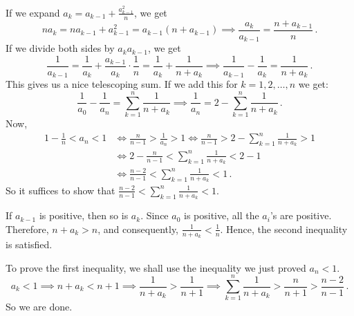 \documentclass[11pt]{scrartcl}
\begin{document}
\begin{soln}
If we expand \(a_{k}=a_{k-1}+\frac{a_{k-1}^{2}}{n}\), we get
\[
n a_{k}= na_{k-1}+a_{k-1}^2 =a_{k-1}\left(n+a_{k-1}\right) \implies  \frac{a_{k}}{a_{k-1}}=\frac{n+a_{k-1}}{n} \, .
\]
If we divide both sides by \(a_{k} a_{k-1}\), we get
\[
\frac{1}{a_{k-1}}=\frac{1}{a_{k}}+\frac{a_{k-1}}{a_{k}} \cdot \frac{1}{n} = \frac{1}{a_{k}} + \frac{1}{n+a_{k}}
\implies \frac{1}{a_{k-1}}-\frac{1}{a_{k}}=\frac{1}{n+a_{k}} \, .
\]
This gives us a nice telescoping sum. If we add this for \(k=1,2, \ldots, n\) we get:
\[
\frac{1}{a_{0}}-\frac{1}{a_{n}}=\sum_{k=1}^{n} \frac{1}{n+a_{k}} \implies \frac{1}{a_{n}}=2-\sum_{k=1}^{n} \frac{1}{n+a_{k}} \, .
\]
Now,
\begin{equation*}
\begin{split}
1- \frac{1}{n} < a_n < 1 &\iff \frac{n}{n-1} > \frac{1}{a_n} > 1 \iff \frac{n}{n-1} > 2-\sum_{k=1}^{n} \frac{1}{n+a_{k}} > 1 \\
&\iff 2-\frac{n}{n-1} <\sum_{k=1}^{n} \frac{1}{n+a_{k}} <2- 1 \\
&\iff \frac{n-2}{n-1}<\sum_{k=1}^{n} \frac{1}{n+a_{k}}<1 \, .
\end{split}
\end{equation*}
So it suffices to show that \(\frac{n-2}{n-1}<\sum_{k=1}^{n} \frac{1}{n+a_{k}}<1\).

If \(a_{k-1}\) is positive, then so is \(a_k\). Since \(a_0\) is positive, all the \(a_i\)'s are positive. Therefore, \(n+a_{k} > n\), and consequently, \(\frac{1}{n+a_{k}} < \frac{1}{n}\). Hence, the second inequality is satisfied.

To prove the first inequality, we shall use the inequality we just proved \(a_n < 1\).
\[ a_k < 1 \implies n+ a_k < n+1 \implies \frac{1}{n+a_k} > \frac{1}{n+1} \implies  \sum_{k=1}^{n} \frac{1}{n+a_{k}} > \frac{n}{n+1} > \frac{n-2}{n-1} \, . \]
So we are done.
\end{soln}
\end{document}
